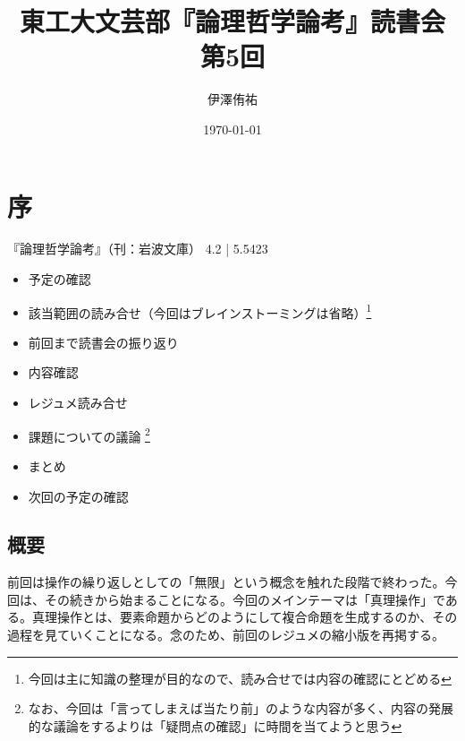 \documentclass[11pt,a4paper,onecolumn,article]{jarticle}
\title{東工大文芸部『論理哲学論考』読書会 第5回}
\author{伊澤侑祐}
\date{\today}
\newcounter{ct}               %
\begin{document}
\maketitle

\section{序}

『論理哲学論考』（刊：岩波文庫） 4.2 | 5.5423
\\

{\small
\begin{itemize}
  \item 予定の確認
  \item 該当範囲の読み合せ（今回はブレインストーミングは省略）\footnote{今回は主に知識の整理が目的なので、読み合せでは内容の確認にとどめる}
  \item 前回まで読書会の振り返り
  \item 内容確認
  \item レジュメ読み合せ
  \item 課題についての議論 \footnote{なお、今回は「言ってしまえば当たり前」のような内容が多く、内容の発展的な議論をするよりは「疑問点の確認」に時間を当てようと思う}
  \item まとめ
  \item 次回の予定の確認
\end{itemize} }

\subsection{概要}
前回は操作の繰り返しとしての「無限」という概念を触れた段階で終わった。今回は、その続きから始まることになる。今回のメインテーマは「真理操作」である。真理操作とは、要素命題からどのようにして複合命題を生成するのか、その過程を見ていくことになる。念のため、前回のレジュメの縮小版を再掲する。
\end{document}
